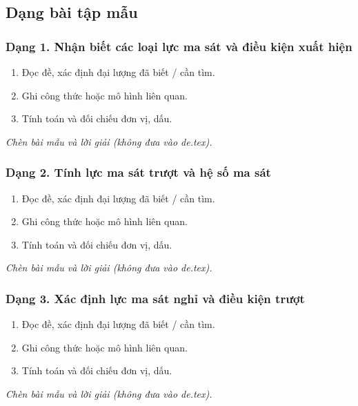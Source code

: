 

\subsection{Dạng bài tập mẫu}
\subsubsection{Dạng 1. Nhận biết các loại lực ma sát và điều kiện xuất hiện}
\begin{phuongphap}
\begin{enumerate}
\item Đọc đề, xác định đại lượng đã biết / cần tìm.
\item Ghi công thức hoặc mô hình liên quan.
\item Tính toán và đối chiếu đơn vị, dấu.
\end{enumerate}
\end{phuongphap}
\begin{vidumau}
\textit{Chèn bài mẫu và lời giải (không đưa vào de.tex).}
\end{vidumau}

\subsubsection{Dạng 2. Tính lực ma sát trượt và hệ số ma sát}
\begin{phuongphap}
\begin{enumerate}
\item Đọc đề, xác định đại lượng đã biết / cần tìm.
\item Ghi công thức hoặc mô hình liên quan.
\item Tính toán và đối chiếu đơn vị, dấu.
\end{enumerate}
\end{phuongphap}
\begin{vidumau}
\textit{Chèn bài mẫu và lời giải (không đưa vào de.tex).}
\end{vidumau}

\subsubsection{Dạng 3. Xác định lực ma sát nghỉ và điều kiện trượt}
\begin{phuongphap}
\begin{enumerate}
\item Đọc đề, xác định đại lượng đã biết / cần tìm.
\item Ghi công thức hoặc mô hình liên quan.
\item Tính toán và đối chiếu đơn vị, dấu.
\end{enumerate}
\end{phuongphap}
\begin{vidumau}
\textit{Chèn bài mẫu và lời giải (không đưa vào de.tex).}
\end{vidumau}


